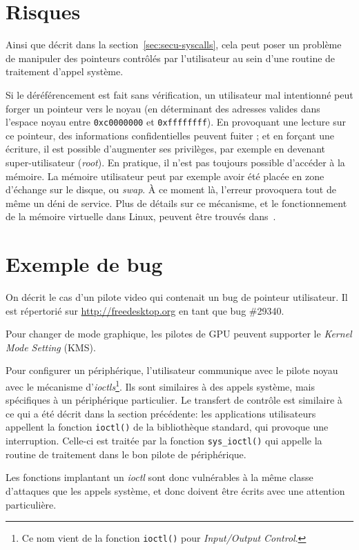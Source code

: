 \section{Risques}

Ainsi que décrit dans la section~\ref{sec:secu-syscalls}, cela peut poser un
problème de manipuler des pointeurs contrôlés par l'utilisateur au sein d'une
routine de traitement d'appel système.

Si le déréférencement est fait sans vérification, un utilisateur mal intentionné
peut forger un pointeur vers le noyau (en déterminant des adresses valides dans
l'espace noyau entre \texttt{0xc0000000} et \texttt{0xffffffff}). En provoquant
une lecture sur ce pointeur, des informations confidentielles peuvent fuiter ;
et en forçant une écriture, il est possible d'augmenter ses privilèges, par
exemple en devenant super-utilisateur (\emph{root}). En pratique, il n'est pas
toujours possible d'accéder à la mémoire. La mémoire utilisateur peut par
exemple avoir été placée en zone d'échange sur le disque, ou \emph{swap}. À ce
moment là, l'erreur provoquera tout de même un déni de service. Plus de détails
sur ce mécanisme, et le fonctionnement de la mémoire virtuelle dans Linux,
peuvent être trouvés dans~\cite{userspaceaccess}.

\section{Exemple de bug}

On décrit le cas d'un pilote video qui contenait un bug de pointeur utilisateur.
Il est répertorié sur \url{http://freedesktop.org} en tant que bug \#29340. 

Pour changer de mode graphique, les pilotes de GPU peuvent supporter le
\emph{Kernel Mode Setting} (KMS).

Pour configurer un périphérique, l'utilisateur communique avec le pilote noyau
avec le mécanisme d'\emph{ioctls}\footnote{
  Ce nom vient de la fonction \verb!ioctl()! pour
  \emph{Input/Output Control}.
}.
Ils sont similaires à des appels système, mais spécifiques à un périphérique
particulier. Le transfert de contrôle est similaire à ce qui a été décrit dans
la section précédente: les applications utilisateurs appellent la fonction
\texttt{ioctl()} de la bibliothèque standard, qui provoque une interruption.
Celle-ci est traitée par la fonction \texttt{sys\_ioctl()} qui appelle la
routine de traitement dans le bon pilote de périphérique.

Les fonctions implantant un \emph{ioctl} sont donc vulnérables à la
même classe d'attaques que les appels système, et donc doivent être écrits avec
une attention particulière.

